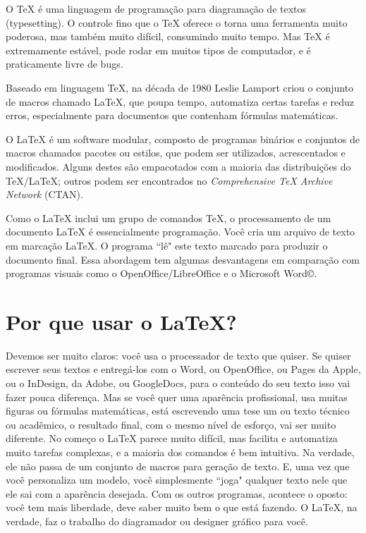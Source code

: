 \documentclass[a4paper,nols,bidi,nohyper]{tufte-book}
\begin{document}
O TeX é uma linguagem de programação para diagramação de textos (typesetting). O controle fino que o TeX oferece o torna uma ferramenta muito poderosa, mas também muito difícil, consumindo muito tempo.  Mas TeX é extremamente estável, pode rodar em muitos tipos de computador, e é praticamente livre de bugs.

Baseado em linguagem \TeX, na década de 1980 Leslie Lamport criou o conjunto de macros chamado \LaTeX, que poupa tempo, automatiza certas tarefas e reduz erros, especialmente para documentos que contenham fórmulas matemáticas.

O \LaTeX{} é um software modular, composto de programas binários e conjuntos de macros chamados pacotes ou estilos, que podem ser utilizados, acrescentados e modificados. Alguns destes são empacotados com a maioria das distribuições do TeX/\LaTeX; outros podem ser encontrados no \textit{Comprehensive TeX Archive Network} (CTAN).

Como o \LaTeX{} inclui um grupo de comandos TeX, o processamento de um documento \LaTeX{} é essencialmente programação. Você cria um arquivo de texto em marcação \LaTeX. O programa ``lê" este texto marcado para produzir o documento final.
Essa abordagem tem algumas desvantagens em comparação com programas visuais como o OpenOffice/LibreOffice e o Microsoft Word©.

\section{Por que usar o \LaTeX?}

Devemos ser muito claros: você usa o processador de texto que quiser. Se quiser escrever seus textos e entregá-los com o Word, ou OpenOffice, ou Pages da Apple, ou o InDesign, da Adobe, ou GoogleDocs, para o conteúdo do seu texto isso vai fazer pouca diferença. Mas se você quer uma aparência profissional, usa muitas figuras ou fórmulas matemáticas, está escrevendo uma tese um ou texto técnico ou acadêmico, o resultado final, com o mesmo nível de esforço, vai ser muito diferente. No começo o \LaTeX{} parece muito difícil, mas facilita e automatiza muito tarefas complexas, e a maioria dos comandos é bem intuitiva. Na verdade, ele não passa de um conjunto de macros para geração de texto. E, uma vez que você personaliza um modelo, você simplesmente ``joga" qualquer texto nele que ele sai com a aparência desejada. Com os outros programas, acontece o oposto: você tem mais liberdade, deve saber muito bem o que está fazendo. O \LaTeX{}, na verdade, faz o trabalho do diagramador ou designer gráfico para você.
\end{document}
